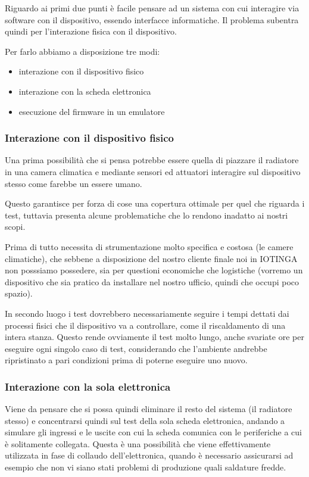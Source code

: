 \documentclass[a4paper,titlepage]{article}
\begin{document}
Riguardo ai primi due punti è facile pensare ad un sistema con cui interagire via
software con il dispositivo, essendo interfacce informatiche. Il problema subentra quindi
per l'interazione fisica con il dispositivo.

Per farlo abbiamo a disposizione tre modi:
\begin{itemize}
    \item interazione con il dispositivo fisico
    \item interazione con la scheda elettronica
    \item esecuzione del firmware in un emulatore
\end{itemize}

\subsubsection{Interazione con il dispositivo fisico}

Una prima possibilità che si pensa potrebbe essere quella di piazzare il radiatore in una camera
climatica e mediante sensori ed attuatori interagire sul dispositivo stesso come farebbe
un essere umano.

Questo garantisce per forza di cose una copertura ottimale per quel che riguarda i
test, tuttavia presenta alcune problematiche che lo rendono inadatto ai nostri scopi.

Prima di tutto necessita di strumentazione molto specifica e costosa (le camere climatiche),
che sebbene a disposizione del nostro cliente finale noi in IOTINGA non posssiamo
possedere, sia per questioni economiche che logistiche (vorremo un dispositivo che
sia pratico da installare nel nostro ufficio, quindi che occupi poco spazio).

In secondo luogo i test dovrebbero necessariamente seguire i tempi dettati dai processi
fisici che il dispositivo va a controllare, come il riscaldamento di una intera stanza.
Questo rende ovviamente il test molto lungo, anche svariate ore per eseguire ogni singolo
caso di test, considerando che l'ambiente andrebbe ripristinato a pari condizioni prima
di poterne eseguire uno nuovo.

\subsubsection{Interazione con la sola elettronica}

Viene da pensare che si possa quindi eliminare il resto del sistema (il radiatore
stesso) e concentrarsi quindi sul test della sola scheda elettronica, andando a
simulare gli ingressi e le uscite con cui la scheda comunica con le periferiche
a cui è solitamente collegata. Questa è una possibilità che viene effettivamente
utilizzata in fase di collaudo dell'elettronica, quando è necessario assicurarsi ad
esempio che non vi siano stati problemi di produzione quali saldature fredde.
\end{document}
